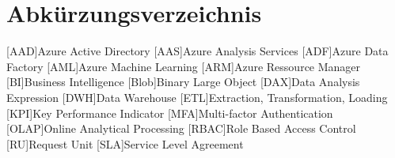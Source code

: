 \renewcommand{\chaptermark}[1]{\markboth{\spacedlowsmallcaps{#1}}{\spacedlowsmallcaps{#1}}}
\renewcommand{\sectionmark}[1]{\markright{\thesection\enspace\spacedlowsmallcaps{#1}}}
\chapter*{Abk\"{u}rzungsverzeichnis}

\begin{acronym}[RBAC]
    [AAD]{Azure Active Directory}
    [AAS]{Azure Analysis Services}
    [ADF]{Azure Data Factory}
    [AML]{Azure Machine Learning}
    [ARM]{Azure Ressource Manager}
    [BI]{Business Intelligence}
    [Blob]{Binary Large Object}
    [DAX]{Data Analysis Expression}
    [DWH]{Data Warehouse}
    [ETL]{Extraction, Transformation, Loading}
    [KPI]{Key Performance Indicator}
    [MFA]{Multi-factor Authentication}
    [OLAP]{Online Analytical Processing}
    [RBAC]{Role Based Access Control}
    [RU]{Request Unit}
    [SLA]{Service Level Agreement}
\end{acronym}

\cleardoublepage
